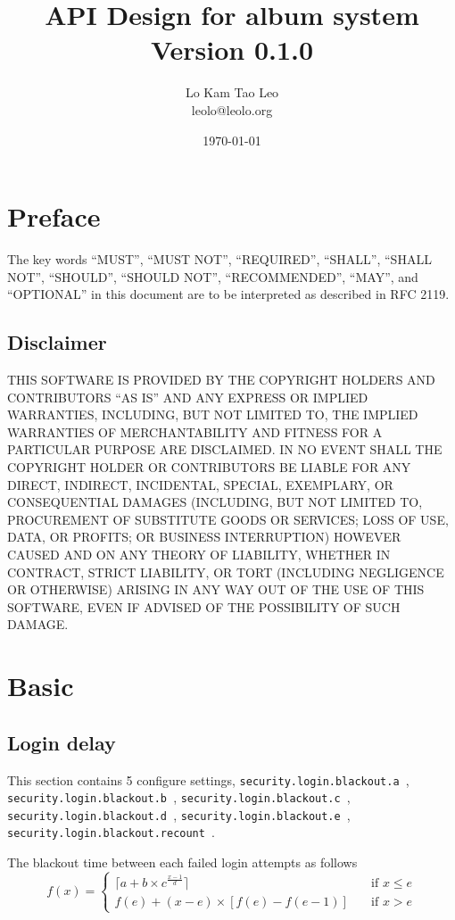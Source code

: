 \documentclass[a4paper,12pt]{report}
\title{API Design for album system Version 0.1.0}
\author{Lo Kam Tao Leo\\leolo@leolo.org}
\date{\today}
\begin{document}
	\maketitle
	\tableofcontents
	\setcounter{chapter}{-1}
	\chapter{Preface}
	The key words ``MUST'', ``MUST NOT'', ``REQUIRED'', ``SHALL'', ``SHALL
	NOT'', ``SHOULD'', ``SHOULD NOT'', ``RECOMMENDED'',  ``MAY'', and
	``OPTIONAL'' in this document are to be interpreted as described in
	RFC 2119.
	\section{Disclaimer}
	THIS SOFTWARE IS PROVIDED BY THE COPYRIGHT HOLDERS AND CONTRIBUTORS ``AS IS''
	AND ANY EXPRESS OR IMPLIED WARRANTIES, INCLUDING, BUT NOT LIMITED TO, THE
	IMPLIED WARRANTIES OF MERCHANTABILITY AND FITNESS FOR A PARTICULAR PURPOSE ARE
	DISCLAIMED. IN NO EVENT SHALL THE COPYRIGHT HOLDER OR CONTRIBUTORS BE LIABLE
	FOR ANY DIRECT, INDIRECT, INCIDENTAL, SPECIAL, EXEMPLARY, OR CONSEQUENTIAL
	DAMAGES (INCLUDING, BUT NOT LIMITED TO, PROCUREMENT OF SUBSTITUTE GOODS OR
	SERVICES; LOSS OF USE, DATA, OR PROFITS; OR BUSINESS INTERRUPTION) HOWEVER
	CAUSED AND ON ANY THEORY OF LIABILITY, WHETHER IN CONTRACT, STRICT LIABILITY,
	OR TORT (INCLUDING NEGLIGENCE OR OTHERWISE) ARISING IN ANY WAY OUT OF THE USE
	OF THIS SOFTWARE, EVEN IF ADVISED OF THE POSSIBILITY OF SUCH DAMAGE.
	\chapter{Basic}
	\section{Login delay}
	This section contains 5 configure settings, \texttt{security.login.blackout.a }, \texttt{security.login.blackout.b }, \texttt{security.login.blackout.c }, \texttt{security.login.blackout.d }, \texttt{security.login.blackout.e }, \texttt{security.login.blackout.recount }.
	
	The blackout time between each failed login attempts as follows
	\begin{equation*}
	f(x) = \begin{cases}
	\lceil a + b \times c ^ {\frac{x-1}{d}}\rceil        & \quad \text{if } x \leqslant e\\
	f(e) + (x-e)\times[f(e) - f(e-1)]  & \quad \text{if } x > e
	\end{cases}
	\end{equation*}
	
	
\end{document}
